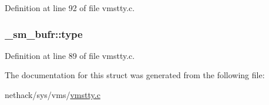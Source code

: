 Definition at line 92 of file vmstty.\+c.

\hypertarget{struct__sm__bufr_a054e961db058544721dfd84fcd024107}{
\subsubsection[{type}]{ \+\_\+sm\+\_\+bufr\+::type}}\label{struct__sm__bufr_a054e961db058544721dfd84fcd024107}


Definition at line 89 of file vmstty.\+c.



The documentation for this struct was generated from the following file\+:\begin{DoxyCompactItemize}
\item 
nethack/sys/vms/\hyperlink{vmstty_8c}{vmstty.\+c}\end{DoxyCompactItemize}
